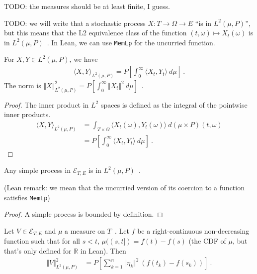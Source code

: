 TODO: the measures should be at least finite, I guess.

TODO: we will write that a stochastic process $X : T \to \Omega \to E$ ``is in $L^2(\mu, P)$'', but this means that the L2 equivalence class of the function $(t, \omega) \mapsto X_t(\omega)$ is in $L^2(\mu, P)$~.
In Lean, we can use \texttt{MemLp} for the uncurried function.


\begin{lemma}\label{lem:L2Predictable.inner_eq}
For $X, Y \in L^2(\mu, P)$, we have
\begin{align*}
  \langle X, Y \rangle_{L^2(\mu, P)} = P\left[ \int_0^{\infty} \langle X_t, Y_t\rangle \: d\mu \right]
  \: .
\end{align*}
The norm is $\Vert X \Vert_{L^2(\mu, P)}^2 = P\left[ \int_0^{\infty} \Vert X_t \Vert^2 \: d\mu \right]$~.
\end{lemma}

\begin{proof}
The inner product in $L^2$ spaces is defined as the integral of the pointwise inner products.
\begin{align*}
  \langle X, Y \rangle_{L^2(\mu, P)}
  &= \int_{T \times \Omega} \langle X_t(\omega), Y_t(\omega) \rangle \: d(\mu \times P)(t, \omega)
  \\
  &= P\left[ \int_0^{\infty} \langle X_t, Y_t\rangle \: d\mu \right]
  \: .
\end{align*}
\end{proof}


\begin{lemma}\label{lem:simpleProcess_mem_L2Predictable}
Any simple process in $\mathcal{E}_{T, E}$ is in $L^2(\mu, P)$~.

(Lean remark: we mean that the uncurried version of its coercion to a function satisfies \texttt{MemLp})
\end{lemma}

\begin{proof}
A simple process is bounded by definition.
\end{proof}


\begin{lemma}\label{lem:L2Predictable.sq_norm_simpleProcess}
Let $V \in \mathcal{E}_{T, E}$ and $\mu$ a measure on $T$~.
Let $f$ be a right-continuous non-decreasing function such that for all $s < t$, $\mu((s,t]) = f(t) - f(s)$ (the CDF of $\mu$, but that's only defined for $\mathbb{R}$ in Lean).
Then
\begin{align*}
  \Vert V \Vert^2_{L^2(\mu, P)}
  &= P\left[ \sum_{k=1}^n \Vert \eta_k \Vert^2 \: (f(t_k) - f(s_k)) \right]
  \: .
\end{align*}
\end{lemma}

